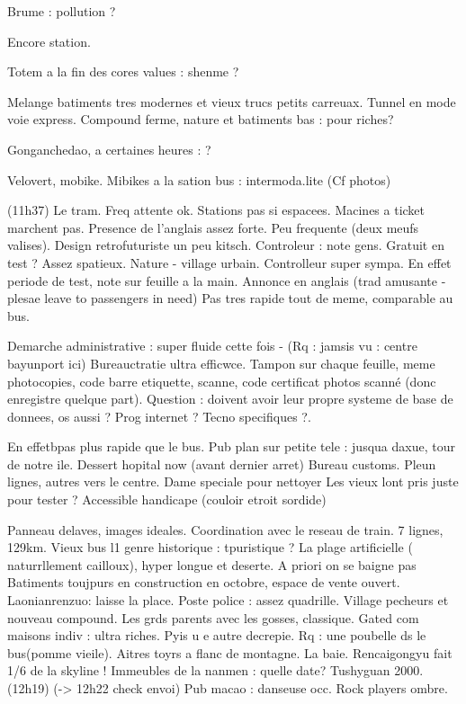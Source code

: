 Brume : pollution ?

Encore station.

Totem a la fin des cores values : shenme ?

Melange batiments tres modernes et vieux trucs petits carreuax.
Tunnel en mode voie express. Compound ferme, nature et batiments bas : pour riches?

Gonganchedao, a certaines heures : ?

Velovert, mobike.
Mibikes a la sation bus : intermoda.lite
(Cf photos)


(11h37)
Le tram. Freq attente ok. Stations pas si espacees. Macines a ticket marchent pas. Presence de l'anglais assez forte.
Peu frequente (deux meufs valises).
Design retrofuturiste un peu kitsch.
Controleur : note gens. Gratuit en test ?
Assez spatieux.
Nature - village urbain.
Controlleur super sympa. En effet periode de test, note sur feuille a la main.
Annonce en anglais (trad amusante - plesae leave to passengers in need)
Pas tres rapide tout de meme, comparable au bus.

Demarche administrative : super fluide cette fois -
(Rq : jamsis vu : centre bayunport ici)
Bureauctratie ultra efficwce. Tampon sur chaque feuille, meme photocopies, code barre etiquette, scanne, code certificat photos scanné (donc enregistre quelque part). Question : doivent avoir leur propre systeme de base de donnees, os aussi ? Prog internet ? Tecno specifiques ?.

En effetbpas plus rapide que le bus.
Pub plan sur petite tele : jusqua daxue, tour de notre ile.
Dessert hopital now (avant dernier arret)
Bureau customs.
Pleun lignes, autres vers le centre.
Dame speciale pour nettoyer
Les vieux lont pris juste pour tester ?
Accessible handicape (couloir etroit sordide)

Panneau delaves, images ideales.
Coordination avec le reseau de train.
7 lignes, 129km.
Vieux bus l1 genre historique : tpuristique ?
La plage artificielle ( naturrllement cailloux), hyper longue et deserte. A priori on se baigne pas
Batiments toujpurs en construction en octobre, espace de vente ouvert.
Laonianrenzuo: laisse la place.
Poste police : assez quadrille. Village pecheurs et nouveau compound.
Les grds parents avec les gosses, classique.
Gated com maisons indiv : ultra riches. Pyis u e autre decrepie.
Rq : une poubelle ds le bus(pomme vieile).
Aitres toyrs a flanc de montagne.
La baie. Rencaigongyu fait 1/6 de la skyline !
Immeubles de la nanmen : quelle date? Tushyguan 2000.
(12h19)
(-> 12h22 check envoi)
Pub macao : danseuse occ. Rock players ombre.





